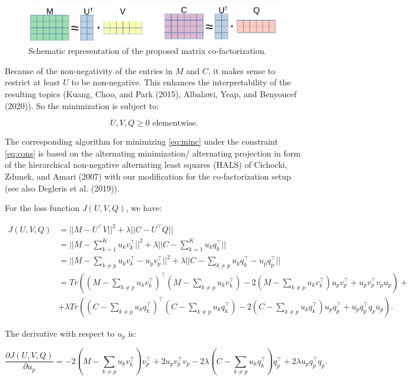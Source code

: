 \documentclass[
]{article}
\begin{document}
\begin{figure}
\includegraphics[width=0.8\linewidth]{images/mf2} \caption{Schematic representation of the proposed matrix co-factorization.}\label{fig:figshem}
\end{figure}

Because of the non-negativity of the entries in \(M\) and \(C\), it makes sense to restrict at least \(U\) to be non-negative. This enhances the interpretability of the resulting topics (Kuang, Choo, and Park (2015), Albalawi, Yeap, and Benyoucef (2020)). So the minimization is subject to:

\begin{equation}U, V,Q \geq 0 \text{ elementwise.}\label{eq:cons}
\end{equation}

The corresponding algorithm for minimizing \eqref{eq:minc} under the constraint \eqref{eq:cons} is based on the alternating minimization/ alternating projection in form of the hierarchical non-negative alternating least squares (HALS) of Cichocki, Zdunek, and Amari (2007) with our modification for the co-factorization setup (see also Degleris et al. (2019)).

For the loss function \(J(U,V,Q)\), we have:

\begin{align*}J(U,V,Q) &= ||M-U^\top V||^2 + \lambda ||C-U^\top Q|| \\
&= ||M-\sum_{k=1}^K u_kv_k^\top||^2 + \lambda ||C-\sum_{k=1}^K u_kq_k^\top||\\
&=||M-\sum_{k\not=p} u_kv_k^\top - u_pv_p^\top||^2 + \lambda ||C-\sum_{k\not=p} u_kq_k^\top - u_pq_p^\top||\\
&= Tr((M-\sum_{k\not=p} u_kv_k^\top)^\top (M-\sum_{k\not=p} u_kv_k^\top) - 2(M-\sum_{k\not=p} u_kv_k^\top)u_pv_p^\top + u_pv_p^\top v_p u_p) + \\
&+\lambda Tr((C-\sum_{k\not=p} u_kq_k^\top)^\top (C-\sum_{k\not=p} u_kq_k^\top) - 2(C-\sum_{k\not=p} u_kq_k^\top)u_pq_p^\top + u_pq_p^\top q_p u_p).
\end{align*}

The derivative with respect to \(u_p\) is:

\[\frac{\partial J(U,V,Q)}{\partial u_p} = - 2(M-\sum_{k\not=p} u_kv_k^\top)v_p^\top + 2u_pv_p^\top v_p - 2\lambda (C-\sum_{k\not=p} u_kq_k^\top)q_p^\top + 2\lambda u_pq_p^\top q_p.\]
\end{document}
